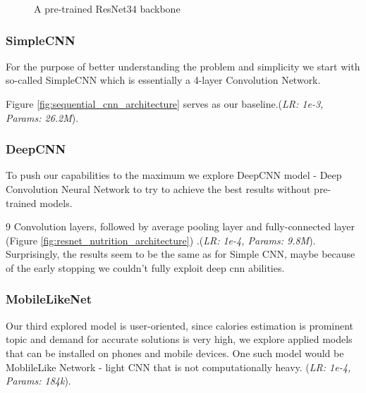 \documentclass[a4paper]{article}
\begin{document}
\begin{figure}[h!]
{
} %
\caption{A pre-trained ResNet34 backbone}
\label{fig:transfer_learning_architecture}
\end{figure}


        
        \subsubsection{SimpleCNN}
            For the purpose of better understanding the problem and simplicity we start with so-called SimpleCNN which is essentially a 4-layer Convolution Network. 

            Figure \ref{fig:sequential_cnn_architecture} serves as our baseline.(\textit{LR: 1e-3, Params: 26.2M}).

            \subsubsection{DeepCNN}
            To push our capabilities to the maximum we explore DeepCNN model - Deep Convolution Neural Network to try to achieve the best results without pre-trained models. 
            
            9 Convolution layers, followed by average pooling layer and fully-connected layer (Figure \ref{fig:resnet_nutrition_architecture}) .(\textit{LR: 1e-4, Params: 9.8M}). Surprisingly, the results seem to be the same as for Simple CNN, maybe because of the early stopping we couldn't fully exploit deep cnn abilities. 

        \subsubsection{MobileLikeNet}{
            Our third explored model is user-oriented, since calories estimation is prominent topic and demand for accurate solutions is very high, we explore applied models that can be installed on phones and mobile devices. One such model would be MoblileLike Network - light CNN that is not computationally heavy. 
            (\textit{LR: 1e-4, Params: 184k}).
        }
\end{document}
